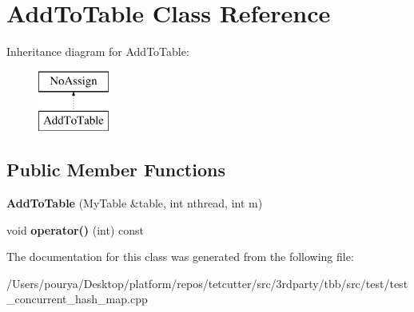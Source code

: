 \hypertarget{classAddToTable}{}\section{Add\+To\+Table Class Reference}
\label{classAddToTable}
Inheritance diagram for Add\+To\+Table\+:\begin{figure}[H]
\begin{center}
\leavevmode
\includegraphics[height=2.000000cm]{classAddToTable}
\end{center}
\end{figure}
\subsection*{Public Member Functions}
\begin{DoxyCompactItemize}
\item 
\hypertarget{classAddToTable_a115eb2c8bde25673532c4c627b2bb22d}{}{\bfseries Add\+To\+Table} (My\+Table \&table, int nthread, int m)\label{classAddToTable_a115eb2c8bde25673532c4c627b2bb22d}

\item 
\hypertarget{classAddToTable_a0cd369f0dfdd0a47769573bd145dcfc1}{}void {\bfseries operator()} (int) const \label{classAddToTable_a0cd369f0dfdd0a47769573bd145dcfc1}

\end{DoxyCompactItemize}


The documentation for this class was generated from the following file\+:\begin{DoxyCompactItemize}
\item 
/\+Users/pourya/\+Desktop/platform/repos/tetcutter/src/3rdparty/tbb/src/test/test\+\_\+concurrent\+\_\+hash\+\_\+map.\+cpp\end{DoxyCompactItemize}
